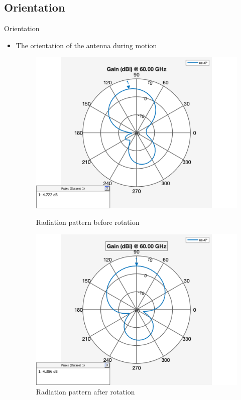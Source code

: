 \documentclass{beamer}
\newcounter{section}
\begin{document}
\subsection{Orientation}
\begin{frame}[t]{Orientation}
	\begin{itemize}
	    \item The orientation of the antenna during motion
        \vspace{1.0\baselineskip}
            \begin{figure}
                \centering
                \begin{minipage}{0.47\textwidth}
                    \centering
                    \includegraphics[height=0.7\textwidth]{figures/original_pattern.png}
                    \caption{Radiation pattern before rotation}
                \end{minipage}
                \begin{minipage}{0.47\textwidth}
                    \centering
                    \includegraphics[height=0.7\textwidth]{figures/orientated_pattern.png}
                    \caption{Radiation pattern after rotation}
                \end{minipage}
            \end{figure}
	\end{itemize}
\end{frame}
\end{document}
